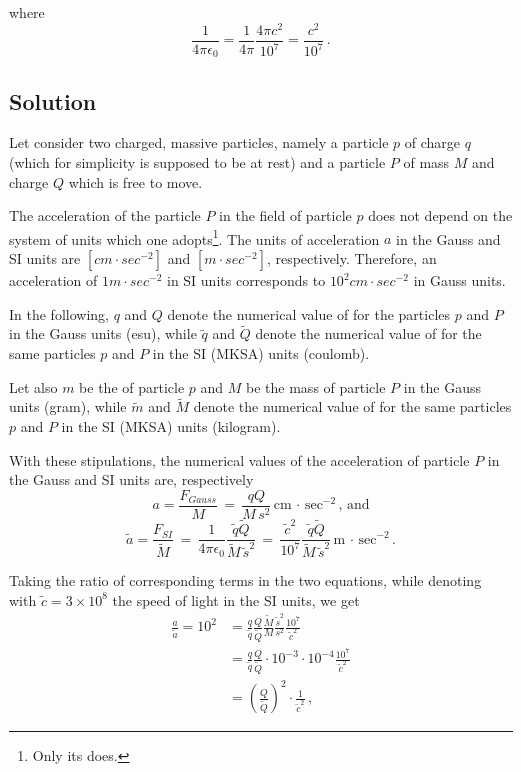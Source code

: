 where $$\frac{1}{4 \pi \epsilon_{0}} = \frac{1}{4 \pi} \frac{4 \pi c^2}{10^7} = \frac{c^2}{10^7}\,.$$

\subsection*{Solution}

Let consider two charged, massive particles, namely a  particle $p$ of charge $q$ (which for simplicity is supposed to be at rest) and a  particle $P$ of mass $M$ and charge $Q$ which is free to move. 

The acceleration of the particle $P$ in the field of particle $p$ does not depend on the system of units which one adopts\footnote{Only its  does.}. The units of acceleration $a$ in the Gauss and SI units are $[cm \cdot sec^{-2}]$ and $[m \cdot sec^{-2}]$, respectively. Therefore, an acceleration of $1 m \cdot sec^{-2}$ in SI units corresponds to $10^2 cm \cdot sec^{-2}$ in Gauss units. 

In the following, $q$ and $Q$ denote the numerical value of  for the particles $p$ and $P$ in the Gauss units (esu), while $\tilde{q}$ and $\tilde{Q}$ denote the numerical value of  for the same particles $p$ and $P$ in the SI (MKSA) units (coulomb). 

Let also $m$ be the  of particle $p$ and $M$ be the mass of particle $P$ in the Gauss units (gram), while $\tilde{m}$ and $\tilde{M}$ denote the numerical value of  for the same particles $p$ and $P$ in the SI (MKSA) units (kilogram).

With these stipulations, the numerical values of the acceleration of particle $P$ in the Gauss and SI units are, respectively 
$$a = \frac{F_{Gauss}}{M}\,=\, \frac{qQ}{M\,s^2}\, \text{cm}\, \cdot\, \text{sec}^{-2}\,\text{, and}$$    
$$\tilde{a} = \frac{F_{SI}}{\tilde{M}}\,=\, \frac{1}{4 \pi \epsilon_{0}} \frac{\tilde{q}\tilde{Q}}{\tilde{M}\,\tilde{s}^2}\,
=\, \frac{\tilde{c}^2}{10^7} \frac{\tilde{q}\tilde{Q}}{\tilde{M}\,\tilde{s}^2}\,  \text{m}\, \cdot\, \text{sec}^{-2}\, \text{.}$$   

Taking the ratio of corresponding terms in the two equations, while denoting with $\tilde{c} = 3 \times 10^8$ the speed of light in the SI units, we get 
\begin{align*}
\frac{a}{\tilde{a}} = 10^2 &=  \frac{q}{\tilde{q}}  \frac{Q}{\tilde{Q}} \frac{\tilde{M}}{M} \frac{\tilde{s}^2}{s^2} \frac{10^7}{\tilde{c}^2}\\
                           &=  \frac{q}{\tilde{q}}  \frac{Q}{\tilde{Q}} \cdot       10^{-3} \cdot           10^{-4} \frac{10^7}{\tilde{c}^2}\\
                           &= \left( \frac{Q}{\tilde{Q}} \right)^2 \cdot \frac{1}{\tilde{c}^2}\,,
\end{align*}

